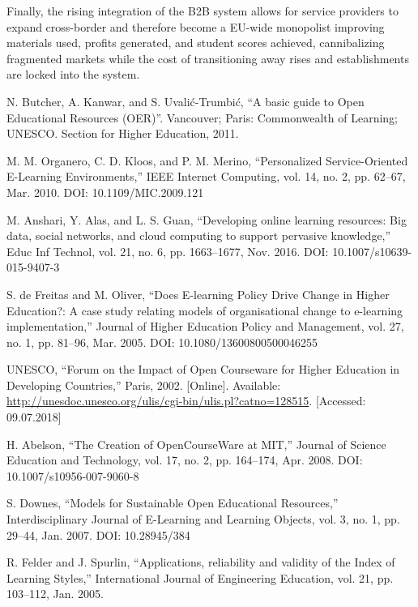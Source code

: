\documentclass[a4paper]{article}
\begin{document}
\noindent
Finally, the rising integration of the B2B system allows for service providers to expand cross-border and therefore become a EU-wide monopolist improving materials used, profits generated, and student scores achieved, cannibalizing fragmented markets while the cost of transitioning away rises and establishments are locked into the system. \\

\newpage
\begin{thebibliography}{}
 N. Butcher, A. Kanwar, and S. Uvali\'{c}-Trumbi\'{c}, ``A basic guide to Open Educational Resources (OER)''. Vancouver; Paris: Commonwealth of Learning; UNESCO. Section for Higher Education, 2011.

 M. M. Organero, C. D. Kloos, and P. M. Merino, ``Personalized Service-Oriented E-Learning Environments,'' IEEE Internet Computing, vol. 14, no. 2, pp. 62–67, Mar. 2010. DOI: 10.1109/MIC.2009.121 

 M. Anshari, Y. Alas, and L. S. Guan, ``Developing online learning resources: Big data, social networks, and cloud computing to support pervasive knowledge,'' Educ Inf Technol, vol. 21, no. 6, pp. 1663–1677, Nov. 2016. DOI: 10.1007/s10639-015-9407-3

 S. de Freitas and M. Oliver, ``Does E-learning Policy Drive Change in Higher Education?: A case study relating models of organisational change to e-learning implementation,'' Journal of Higher Education Policy and Management, vol. 27, no. 1, pp. 81–96, Mar. 2005. DOI: 10.1080/13600800500046255

 UNESCO, ``Forum on the Impact of Open Courseware for Higher Education in Developing Countries,'' Paris, 2002. [Online]. Available: \url{http://unesdoc.unesco.org/ulis/cgi-bin/ulis.pl?catno=128515}. [Accessed: 09.07.2018]

 H. Abelson, ``The Creation of OpenCourseWare at MIT,'' Journal of Science Education and Technology, vol. 17, no. 2, pp. 164--174, Apr. 2008. DOI: 10.1007/s10956-007-9060-8

 S. Downes, ``Models for Sustainable Open Educational Resources,'' Interdisciplinary Journal of E-Learning and Learning Objects, vol. 3, no. 1, pp. 29--44, Jan. 2007. DOI: 10.28945/384

 R. Felder and J. Spurlin, ``Applications, reliability and validity of the Index of Learning Styles,'' International Journal of Engineering Education, vol. 21, pp. 103--112, Jan. 2005.


\end{thebibliography}
\end{document}
